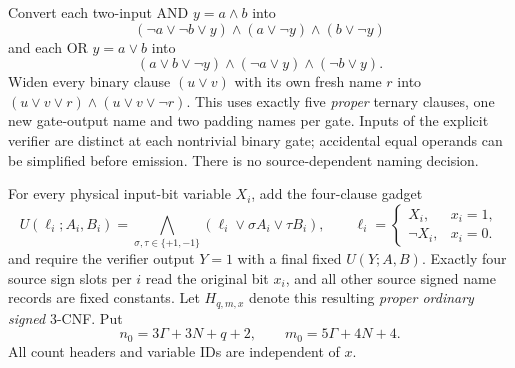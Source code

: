 \documentclass[11pt]{article}
\begin{document}
Convert each two-input AND $y=a\wedge b$ into
\[
 (\neg a\vee\neg b\vee y)\wedge(a\vee\neg y)\wedge(b\vee\neg y)
\]
and each OR $y=a\vee b$ into
\[
 (a\vee b\vee\neg y)\wedge(\neg a\vee y)\wedge(\neg b\vee y).
\]
Widen every binary clause $(u\vee v)$ with its own fresh name $r$ into
$(u\vee v\vee r)\wedge(u\vee v\vee\neg r)$. This uses exactly five \emph{proper} ternary clauses, one new gate-output name and two padding names per gate. Inputs of the explicit verifier are distinct at each nontrivial binary gate; accidental equal operands can be simplified before emission. There is no source-dependent naming decision.

For every physical input-bit variable $X_i$, add the four-clause gadget
\[
 U(\ell_i;A_i,B_i)=\bigwedge_{\sigma,\tau\in\{+1,-1\}}
 (\ell_i\vee \sigma A_i\vee\tau B_i),\qquad
 \ell_i=\begin{cases}X_i,&x_i=1,\\\neg X_i,&x_i=0.
 \end{cases}\tag{3}
\]
and require the verifier output $Y=1$ with a final fixed $U(Y;A,B)$. Exactly four source sign slots per $i$ read the original bit $x_i$, and all other source signed name records are fixed constants. Let $H_{q,m,x}$ denote this resulting \emph{proper ordinary signed} 3-CNF. Put
\[
 n_0=3\Gamma+3N+q+2,\qquad m_0=5\Gamma+4N+4.\tag{4}
\]
All count headers and variable IDs are independent of $x$.
\end{document}
